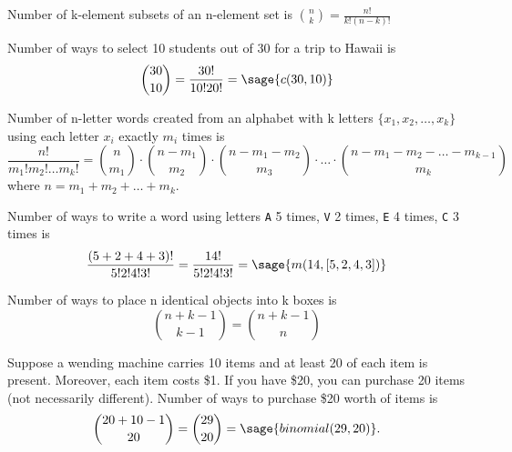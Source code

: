 \documentclass{ximera}
\begin{document}
\begin{theorem}
Number of k-element subsets of an n-element set is $\binom{n}{k}=\frac{n!}{k!(n-k)!}$
\end{theorem}


\begin{example}
Number of ways to select 10 students out of 30 for a trip to Hawaii is  
$$
\binom{30}{10}
=
\frac{30!}{10!20!}
=
\sage{c(30,10)}
$$ 
\end{example}

\begin{theorem}
Number of n-letter words created from an alphabet with k letters $\{x_1,x_2,\ldots, x_k\}$ using each letter $x_i$ exactly $m_i$ times is 
$$\frac{n!}{m_1!m_2!\ldots m_k!}=\binom{n}{m_1}\cdot \binom{n-m_1}{m_2}\cdot \binom{n-m_1-m_2}{m_3}\cdot \ldots \cdot \binom{n-m_1-m_2-\ldots -m_{k-1}}{m_k}$$ 
where $n=m_1+m_2+\ldots+m_k$.
\end{theorem}

\begin{example}
Number of ways to write a word using letters \verb!A! 5 times, \verb!V! 2 times, \verb!E! 4 times, \verb!C! 3 times is 
$$
\frac{(5+2+4+3)!}{5!2!4!3!}
=
\frac{14!}{5!2!4!3!}
=
\sage{m(14,[5,2,4,3])}
$$ 
\end{example}

\begin{theorem}
Number of ways to place n identical objects into k boxes  is 
$$
\binom{n+k-1}{k-1}=\binom{n+k-1}{n}
$$
\end{theorem}

\begin{example}
Suppose a wending machine carries 10 items and at least 20 of each item is present. Moreover, each item costs \$1. If you have \$20, you can purchase 20 items (not necessarily different). Number of ways to purchase \$20 worth of items is 
$$
\binom{20+10-1}{20}
=
\binom{29}{20}
=
\sage{binomial(29,20)}
.
$$
\end{example}
\end{document}

